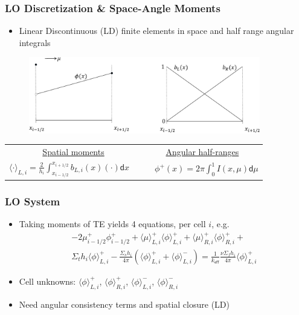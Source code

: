 \documentclass[xcolor=dvipsnames,handout,unknownkeysallowed]{beamer}
\newcommand{\keff}[0]{\ensuremath{{k}_{\textsf{eff}}} }
\newcommand{\colb}[1]{{\color{blue} #1}}
\newlength{\wideitemsep}
\let\olditem\item
\renewcommand{\item}{\setlength{\itemsep}{\wideitemsep}\olditem}
\renewcommand{\d}{\mathsf{d}}
\newcommand{\mom}[1]{\langle #1 \rangle}
\newcommand{\il}{{i-1/2}}
\newcommand{\ir}{{i+1/2}}
\begin{document}
\begin{frame}
    \frametitle{LO Discretization \& Space-Angle Moments}
    \begin{itemize}
        \item Linear Discontinuous (LD) finite elements in space and half range
            angular integrals
    \end{itemize}
    \begin{figure}
    \begin{centering}
        \includegraphics[width=0.9\textwidth]{LD.pdf}
    \end{centering}
    \end{figure}
    \begin{center}
    \begin{tabular}{cc}
        \underline{Spatial moments} & \underline{Angular half-ranges} \\ 
        $ {\displaystyle \mom{\cdot}_{L,i} = \frac{2}{h_i} \int_{x_\il}^{x_\ir}
        b_{L,i}(x)(\cdot) \d x \quad }$  & ${ \quad \displaystyle \phi^+(x) = 2\pi\int_0^1 I(x,\mu) \d \mu}$
    \end{tabular}
    \end{center}

\end{frame}




\begin{frame}
    \frametitle{LO System}
    \begin{itemize}
        \item Taking moments of TE yields \colb{4 equations}, per cell $i$, e.g.
        {\small
        \begin{multline*}\label{lo_tran}
    -2{\mu}_{i-1/2}^{+} \phi_{i-1/2}^{+} + \mom {\mu}_{L,i}^{+}
  \mom{\phi}_{L,i}^{+}
  +  \mom\mu_{R,i}^{+}
  \mom{\phi}_{R,i}^{+} + \\ \Sigma_t h_i \mom{\phi}_{L,i}^+ -  \frac{\Sigma_s h_i}{4\pi} \left( \mom{\phi}_{L,i}^{+} +
  \mom\phi_{L,i}^{-}\right) = \frac{1}{\keff} \frac{\nu \Sigma_fh_i}{4\pi}\mom{\phi}_{L,i}^{+}
\end{multline*}}
        \item Cell unknowns: $\mom{\phi}_{L,i}^{+}$, $\mom{\phi}_{R,i}^{+}$,
        $\mom{\phi}_{L,i}^{-}$, $\mom{\phi}_{R,i}^{-}$ 

    \item Need \colb{angular} consistency terms  and spatial closure
        (LD)
    \end{itemize}

\end{frame}
\end{document}
